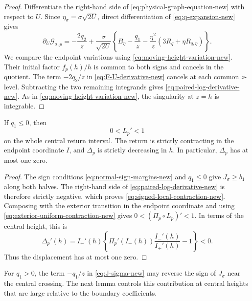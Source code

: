 \begin{proof}
Differentiate the right-hand side of
\eqref{eq:physical-graph-equation-new} with respect to $U$.  Since
$\eta_\sigma=\sigma\sqrt{2U}$, direct differentiation of
\eqref{eq:q-expansion-new} gives
\begin{equation}
\label{eq:F-U-derivative-new}
 \partial_U\mathcal G_{\sigma,p}
 =-\frac{2q_2}{z}
 +\frac{\sigma}{\sqrt{2U}}\left\{
 B_\eta-\frac{q_1}{z}
 -\frac{\eta^2}{z}(3R_q+\eta R_{q,\eta})\right\}.
\end{equation}
We compare the endpoint variations using
\eqref{eq:moving-height-variation-new}. Their initial factor $f_p(h)/h$
is common to both signs and cancels in the quotient. The term $-2q_2/z$
in \eqref{eq:F-U-derivative-new} cancels at each common \(z\)-level.
Subtracting the two remaining integrands gives
\eqref{eq:paired-log-derivative-new}. As in
\eqref{eq:moving-height-variation-new}, the singularity at \(z=h\)
is integrable.
\end{proof}

\begin{proposition}
\label{prop:signed-contraction-new}
If $q_1\le0$, then
\begin{equation}
\label{eq:signed-local-contraction-new}
 0<L_p'<1
\end{equation}
on the whole central return interval. The return is strictly
contracting in the endpoint coordinate $I$, and $\Delta_p$ is strictly
decreasing in $h$. In particular, $\Delta_p$ has at most one zero.
\end{proposition}

\begin{proof}
The sign conditions \eqref{eq:normal-sign-margins-new} and $q_1\le0$ give
$J_\sigma\ge b_1$ along both halves. The right-hand side of
\eqref{eq:paired-log-derivative-new} is therefore strictly negative,
which proves \eqref{eq:signed-local-contraction-new}. Composing with
the exterior transition in the endpoint coordinate and using
\eqref{eq:exterior-uniform-contraction-new} gives
$0<(\Pi_p\circ L_p)'<1$. In terms of the central height, this is
\[
 \Delta_p'(h)=I_+'(h)
   \left\{\Pi_p'(I_-(h))\frac{I_-'(h)}{I_+'(h)}-1\right\}<0.
\]
Thus the displacement has at most one zero.
\end{proof}

For $q_1>0$, the term $-q_1/z$ in \eqref{eq:J-sigma-new} may reverse
the sign of $J_\sigma$ near the central crossing. The next lemma controls
this contribution at central heights that are large relative to the
boundary coefficients.

